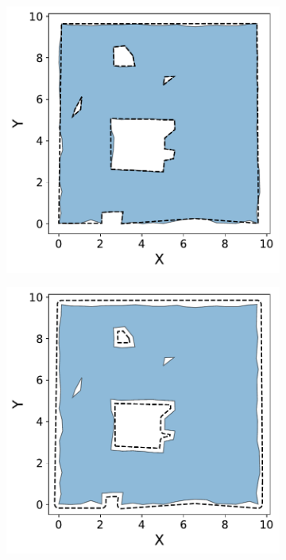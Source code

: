 \begin{figure}[!ht]
  \begin{subfigure}[t]{.30\linewidth}
    \centering\includegraphics[clip,trim=0cm 0cm 0cm 0cm, width=.99\linewidth]{chapter_3_polylidar3d/imgs/polygon/PolygonExtraction_c.pdf}
    \caption{\label{fig:ch3_polygon_post_a}}
  \end{subfigure}
  \hfill
  \begin{subfigure}[t]{.30\linewidth}
    \centering\includegraphics[clip,trim=0cm 0cm 0cm 0cm,width=.99\linewidth]{chapter_3_polylidar3d/imgs/polygon/PolygonExtraction_d.pdf}

\end{subfigure}
\end{figure}
